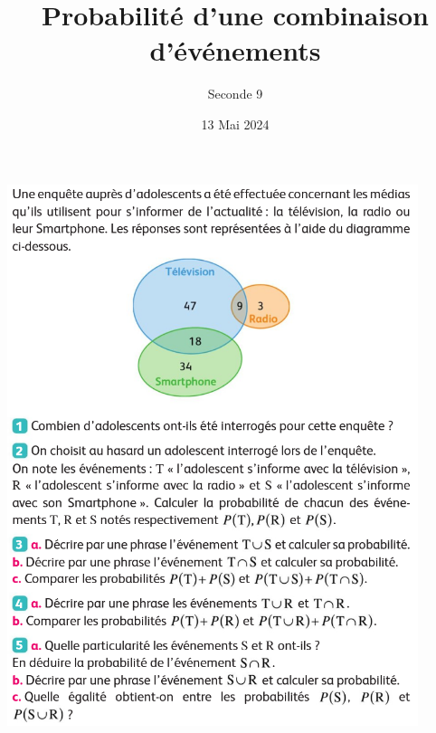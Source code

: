 \documentclass{article}
\title{Probabilité d'une combinaison d'événements}
\author{Seconde 9}
\date{13 Mai 2024}
\begin{document}
\maketitle
\begin{center}
\includegraphics[width=0.9\textwidth]{13_05_2024.png}
\end{center}
\end{document}
